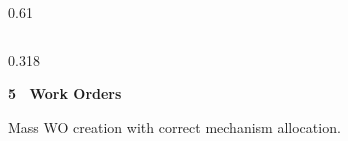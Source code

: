 \begin{frame}[plain]
\begin{columns}[T]
\begin{column}{0.61\textwidth}
\begin{columns}[T]
                \begin{column}{0.318\textwidth}
                    \begin{tcolorbox}[
                        colback=cardbg, colframe=cardborder, arc=3pt, boxrule=0.5pt,
                        left=4pt, right=4pt, top=4pt, bottom=4pt, height=2.3cm
                    ]
                        {\fontsize{7.5}{9}\bfseries\selectfont\color{primary}5 \textbullet\ Work Orders}\par
                        \vspace{0.1cm}
                        {\fontsize{6.6}{8}\selectfont\color{mutedgray}
                        Mass WO creation with correct mechanism allocation.
                        }
                    \end{tcolorbox}
                \end{column}
            \end{columns}
        \end{column}
    \end{columns}
\end{frame}
